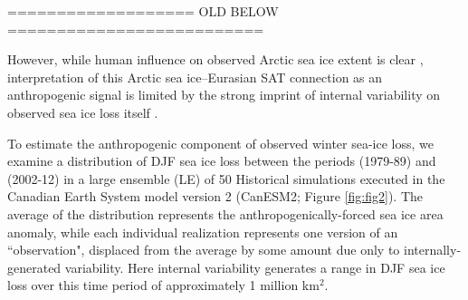 \documentclass{nature}
\begin{document}





 
 
 
 =================== OLD BELOW ==========================
 
 However, while human influence on observed Arctic sea ice extent is clear \cite{min08}, interpretation of this Arctic sea ice--Eurasian SAT connection as an anthropogenic signal is limited by the strong imprint of internal variability on observed sea ice loss itself \cite{swart15}. 

To estimate the anthropogenic component of observed winter sea-ice loss, we examine a distribution of DJF sea ice loss between the periods (1979-89) and (2002-12) in a large ensemble (LE) of 50 Historical simulations executed in the Canadian Earth System model version 2 (CanESM2; Figure \ref{fig:fig2}). The average of the distribution represents the anthropogenically-forced sea ice area anomaly, while each individual realization represents one version of an ``observation", displaced from the average by some amount due only to internally-generated variability. Here internal variability generates a range in DJF sea ice loss over this time period of approximately 1 million km$^2$. 
\end{document}
